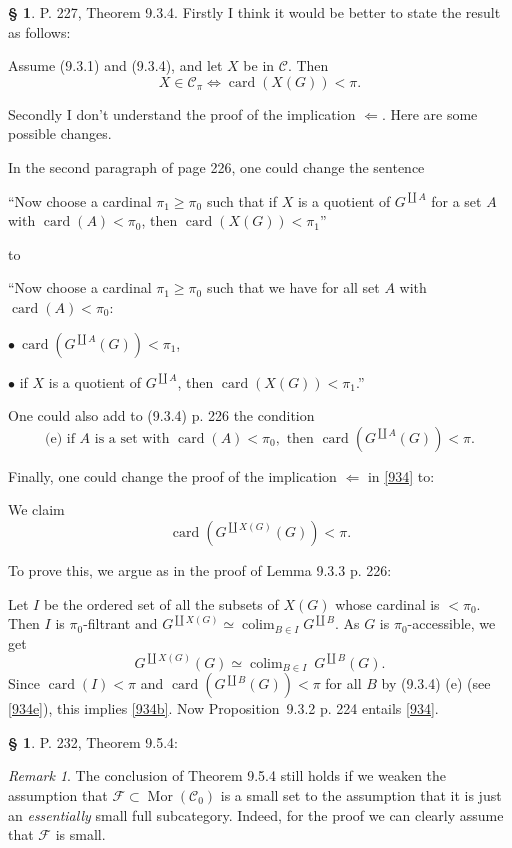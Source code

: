 \documentclass[12pt]{article}
\theoremstyle{remark}
\newtheorem{rk}[thm]{Remark}
\theoremstyle{definition}
\newtheorem{s}[thm]{\S}
\newcommand{\bu}{\bullet}
\newcommand{\cc}{\mathcal}
\newcommand{\C}{\mathcal C}
\DeclareMathOperator*{\co}{colim}
\DeclareMathOperator{\card}{card}%
\DeclareMathOperator{\Mor}{Mor}
\begin{document}
%
%
\begin{s} 
P. 227, Theorem 9.3.4. Firstly I think it would be better to state the result as follows:

Assume (9.3.1) and (9.3.4), and let $X$ be in $\C$. Then 
\begin{equation}\label{934}
X\in\C_\pi\iff\card(X(G))<\pi.
\end{equation} 

Secondly I don't understand the proof of the implication $\Leftarrow$. Here are some possible changes. 

In the second paragraph of page 226, one could change the sentence 

``Now choose a cardinal $\pi_1\ge\pi_0$ such that if $X$ is a quotient of $G^{\coprod A}$ for a set $A$ with $\card(A)<\pi_0$, then $\card(X(G))<\pi_1$''

\noindent to 

``Now choose a cardinal $\pi_1\ge\pi_0$ such that we have for all set $A$ with $\card(A)<\pi_0$: 

$\bu\ \card(G^{\coprod A}(G))<\pi_1$, 

$\bu$ if $X$ is a quotient of $G^{\coprod A}$, then $\card(X(G))<\pi_1$.'' 

One could also add to (9.3.4) p. 226 the condition 
\begin{equation}\label{934e}
\text{(e) if }A\text{ is a set with }\card(A)<\pi_0,\text{ then }\card(G^{\coprod A}(G))<\pi.
\end{equation}

Finally, one could change the proof of the implication $\Leftarrow$ in \eqref{934} to: 

We claim
\begin{equation}\label{934b}
\card(G^{\coprod X(G)}(G))<\pi.
\end{equation} 

To prove this, we argue as in the proof of Lemma 9.3.3 p. 226: 

Let $I$ be the ordered set of all the subsets of $X(G)$ whose cardinal is $<\pi_0$. Then $I$ is $\pi_0$-filtrant and $G^{\coprod X(G)}\simeq\co_{B\in I}G^{\coprod B}$. As $G$ is $\pi_0$-accessible, we get 
$$
G^{\coprod X(G)}(G)\simeq\co_{B\in I}\ G^{\coprod B}(G).
$$ 
Since $\card(I)<\pi$ and $\card(G^{\coprod B}(G))<\pi$ for all $B$ by (9.3.4) (e) (see \eqref{934e}), this implies \eqref{934b}. Now Proposition~9.3.2 p. 224 entails \eqref{934}.
\end{s}
%
%
\begin{s} 
P. 232, Theorem 9.5.4: 
\begin{rk}\label{954}
The conclusion of Theorem 9.5.4 still holds if we weaken the assumption that $\cc F\subset\Mor(\C_0)$ is a small set to the assumption that it is just an {\em essentially} small full subcategory. Indeed, for the proof we can clearly assume that $\cc F$ is small. 
\end{rk}
\end{s}
\end{document}
